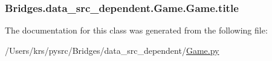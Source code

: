 \subsubsection[{title}]{\setlength{\rightskip}{0pt plus 5cm}Bridges.\+data\+\_\+src\+\_\+dependent.\+Game.\+Game.\+title}\label{class_bridges_1_1data__src__dependent_1_1_game_1_1_game_acdee6e5e3cfde65afd0cf5a781af369c}


The documentation for this class was generated from the following file\+:\begin{DoxyCompactItemize}
\item 
/\+Users/krs/pysrc/\+Bridges/data\+\_\+src\+\_\+dependent/\hyperlink{_game_8py}{Game.\+py}\end{DoxyCompactItemize}

